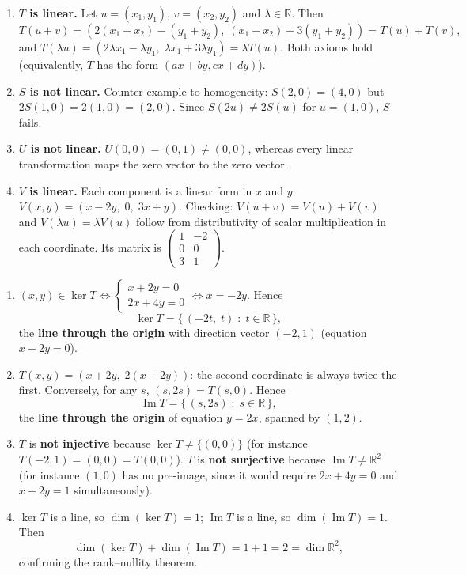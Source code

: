 \documentclass[11pt]{article}
\begin{document}
\begin{corrige}
\begin{enumerate}
\item \textbf{$T$ is linear.} Let $u=(x_{1},y_{1})$, $v=(x_{2},y_{2})$ and $\lambda\in\mathbb{R}$. Then
\[ T(u+v)=(2(x_{1}+x_{2})-(y_{1}+y_{2}),\;(x_{1}+x_{2})+3(y_{1}+y_{2}))=T(u)+T(v), \]
and $T(\lambda u)=(2\lambda x_{1}-\lambda y_{1},\;\lambda x_{1}+3\lambda y_{1})=\lambda T(u)$. Both axioms hold (equivalently, $T$ has the form $(ax+by,cx+dy)$).
\item \textbf{$S$ is not linear.} Counter-example to homogeneity: $S(2,0)=(4,0)$ but $2S(1,0)=2(1,0)=(2,0)$. Since $S(2u)\neq 2S(u)$ for $u=(1,0)$, $S$ fails.
\item \textbf{$U$ is not linear.} $U(0,0)=(0,1)\neq(0,0)$, whereas every linear transformation maps the zero vector to the zero vector.
\item \textbf{$V$ is linear.} Each component is a linear form in $x$ and $y$: $V(x,y)=(x-2y,\;0,\;3x+y)$. Checking: $V(u+v)=V(u)+V(v)$ and $V(\lambda u)=\lambda V(u)$ follow from distributivity of scalar multiplication in each coordinate. Its matrix is $\begin{pmatrix} 1 & -2 \\ 0 & 0 \\ 3 & 1 \end{pmatrix}$.
\end{enumerate}
\end{corrige}

\begin{corrige}
\begin{enumerate}
\item $(x,y)\in\ker T\iff \begin{cases} x+2y=0 \\ 2x+4y=0 \end{cases}\iff x=-2y$. Hence
\[ \ker T=\{\,(-2t,\;t)\;:\;t\in\mathbb{R}\,\}, \]
the \textbf{line through the origin} with direction vector $(-2,1)$ (equation $x+2y=0$).
\item $T(x,y)=(x+2y,\;2(x+2y))$: the second coordinate is always twice the first. Conversely, for any $s$, $(s,2s)=T(s,0)$. Hence
\[ \operatorname{Im}T=\{\,(s,2s)\;:\;s\in\mathbb{R}\,\}, \]
the \textbf{line through the origin} of equation $y=2x$, spanned by $(1,2)$.
\item $T$ is \textbf{not injective} because $\ker T\neq\{(0,0)\}$ (for instance $T(-2,1)=(0,0)=T(0,0)$). $T$ is \textbf{not surjective} because $\operatorname{Im}T\neq\mathbb{R}^{2}$ (for instance $(1,0)$ has no pre-image, since it would require $2x+4y=0$ and $x+2y=1$ simultaneously).
\item $\ker T$ is a line, so $\dim(\ker T)=1$; $\operatorname{Im}T$ is a line, so $\dim(\operatorname{Im}T)=1$. Then
\[ \dim(\ker T)+\dim(\operatorname{Im}T)=1+1=2=\dim\mathbb{R}^{2}, \]
confirming the rank–nullity theorem.
\end{enumerate}
\end{corrige}
\end{document}
